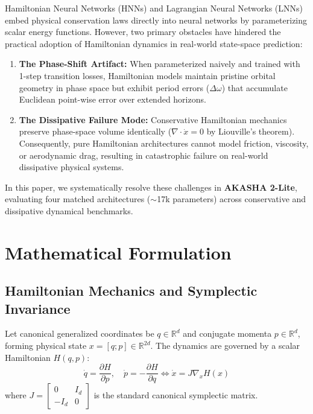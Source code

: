 \documentclass[11pt,a4paper]{article}
\begin{document}
Hamiltonian Neural Networks (HNNs) \cite{greydanus2019hamiltonian} and Lagrangian Neural Networks (LNNs) \cite{cranmer2020lagrangian, lutter2019deep} embed physical conservation laws directly into neural networks by parameterizing scalar energy functions. However, two primary obstacles have hindered the practical adoption of Hamiltonian dynamics in real-world state-space prediction:
\begin{enumerate}
    \item \textbf{The Phase-Shift Artifact:} When parameterized naively and trained with 1-step transition losses, Hamiltonian models maintain pristine orbital geometry in phase space but exhibit period errors ($\Delta \omega$) that accumulate Euclidean point-wise error over extended horizons.
    \item \textbf{The Dissipative Failure Mode:} Conservative Hamiltonian mechanics preserve phase-space volume identically ($\nabla \cdot \dot{x} = 0$ by Liouville's theorem). Consequently, pure Hamiltonian architectures cannot model friction, viscosity, or aerodynamic drag, resulting in catastrophic failure on real-world dissipative physical systems.
\end{enumerate}

In this paper, we systematically resolve these challenges in \textbf{AKASHA 2-Lite}, evaluating four matched architectures ($\sim$17k parameters) across conservative and dissipative dynamical benchmarks.

\section{Mathematical Formulation}

\subsection{Hamiltonian Mechanics and Symplectic Invariance}
Let canonical generalized coordinates be $q \in \mathbb{R}^d$ and conjugate momenta $p \in \mathbb{R}^d$, forming physical state $x = [q; p] \in \mathbb{R}^{2d}$. The dynamics are governed by a scalar Hamiltonian $H(q, p)$:
\begin{equation}
\dot{q} = \frac{\partial H}{\partial p}, \quad \dot{p} = -\frac{\partial H}{\partial q} \iff \dot{x} = J \nabla_x H(x)
\end{equation}
where $J = \begin{bmatrix} 0 & I_d \\ -I_d & 0 \end{bmatrix}$ is the standard canonical symplectic matrix.
\end{document}
